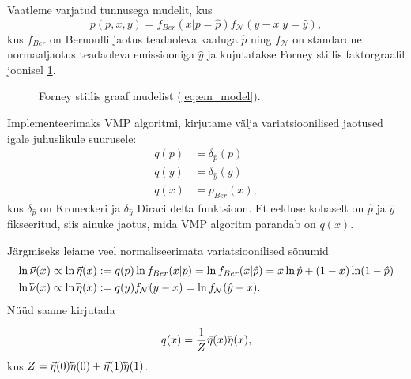 Vaatleme varjatud tunnusega mudelit, kus 
\begin{equation}
    \label{eq:em_model}
     p(p,x,y) = f_{Ber}(x | p = \hat{p}) f_{\mathcal{N}}(y-x|y=\hat{y}),
\end{equation}
kus $f_{Ber}$ on Bernoulli jaotus teadaoleva kaaluga $\hat{p}$ ning $f_{\mathcal{N}}$ on standardne normaaljaotus teadaoleva emissiooniga $\hat{y}$ ja kujutatakse Forney stiilis faktorgraafil joonisel \ref{fig:em_model}.

\begin{figure}[!ht]
\centering
{}%
\caption{Forney stiilis graaf mudelist (\ref{eq:em_model}).}
\label{fig:em_model}
\end{figure}

Implementeerimaks VMP algoritmi, kirjutame välja variatsioonilised jaotused igale juhuslikule suurusele:
\begin{align*}
    q(p) &= \delta_{\hat{p}}(p)\\
    q(y) &= \delta_{\hat{y}}(y)\\
    q(x) &= p_{Ber}(x),
\end{align*}
kus $\delta_{\hat{p}}$ on Kroneckeri ja $\delta_{\hat{y}}$ Diraci delta funktsioon. Et eelduse kohaselt on $\hat{p}$ ja $\hat{y}$ fikseeritud, siis ainuke jaotus, mida VMP algoritm parandab on $q(x)$. 

Järgmiseks leiame veel normaliseerimata variatsioonilised sõnumid
\begin{align*}
    \ln \vec{\nu}(x) &\propto \ln \vec{\eta}(x) := q(p)\ln f_{Ber}(x | p) = \ln f_{Ber}(x | \hat{p}) = x \ln \hat{p} + (1-x) \ln (1-\hat{p})\\
    \ln \cev{\nu}(x) &\propto \ln \cev{\eta}(x) := q(y)f_{\mathcal{N}}(y - x) = \ln f_{\mathcal{N}}(\hat{y} - x).
\end{align*}
Nüüd saame kirjutada

$$q(x) = \frac{1}{Z} \vec{\eta}(x) \cev{\eta}(x),$$
kus $Z = \vec{\eta}(0) \cev{\eta}(0) + \vec{\eta}(1) \cev{\eta}(1)$. 

